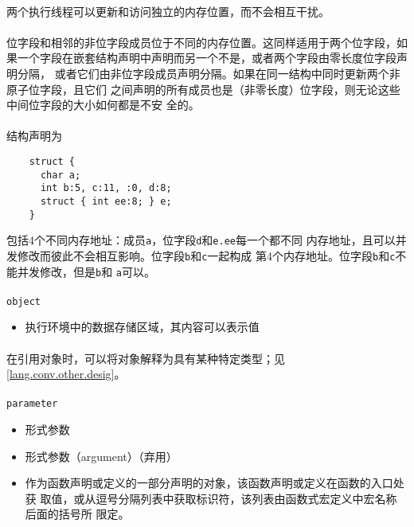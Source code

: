 \paragraph{}
\notes 两个执行线程可以更新和访问独立的内存位置，而不会相互干扰。

\paragraph{}
\notes 位字段和相邻的非位字段成员位于不同的内存位置。这同样适用于两个位字段，如
果一个字段在嵌套结构声明中声明而另一个不是，或者两个字段由零长度位字段声明分隔，
或者它们由非位字段成员声明分隔。如果在同一结构中同时更新两个非原子位字段，且它们
之间声明的所有成员也是（非零长度）位字段，则无论这些中间位字段的大小如何都是不安
全的。

\paragraph{}
\ex* 结构声明为
\begin{lstlisting}
    struct {
      char a;
      int b:5, c:11, :0, d:8;
      struct { int ee:8; } e;
    }
\end{lstlisting}
包括4个不同内存地址：成员\texttt{a}，位字段\texttt{d}和\texttt{e.ee}每一个都不同
内存地址，且可以并发修改而彼此不会相互影响。位字段\texttt{b}和\texttt{c}一起构成
第4个内存地址。位字段\texttt{b}和\texttt{c}不能并发修改，但是\texttt{b}和
\texttt{a}可以。

\paragraph{}
\texttt{object}
\begin{itemize}
  \item[]{执行环境中的数据存储区域，其内容可以表示值}
\end{itemize}

\paragraph{}
\notes* 在引用对象时，可以将对象解释为具有某种特定类型；见
\ref{lang.conv.other.desig}。

\paragraph{}
\texttt{parameter}
\begin{itemize}
  \item[]{形式参数}
  \item[]{形式参数（argument）（弃用）}
  \item[]{作为函数声明或定义的一部分声明的对象，该函数声明或定义在函数的入口处获
    取值，或从逗号分隔列表中获取标识符，该列表由函数式宏定义中宏名称后面的括号所
    限定。}
\end{itemize}

